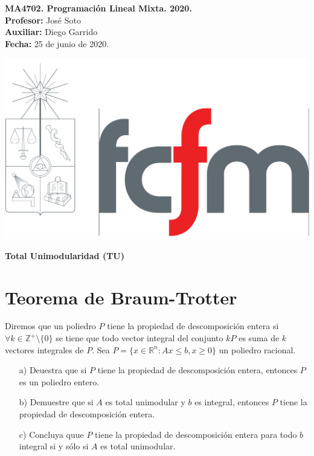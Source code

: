\documentclass[10pt]{article}
\theoremstyle{plain}
\theoremstyle{definition}
\newcommand{\sca}{Diego Garrido}
\newcommand{\fecha}{25 de junio  de 2020}
\begin{document}
\vspace*{-1.2 cm}
\begin{minipage}{0.6\textwidth}
\begin{flushleft}
\hspace*{-0.5cm}\textbf{MA4702. Programación Lineal Mixta. 2020.}\\
\hspace*{-0.5cm}\textbf{Profesor:} José Soto\\
\hspace*{-0.5cm}\textbf{Auxiliar:} \sca\\
\hspace*{-0.5cm}\textbf{Fecha:} \fecha.
\end{flushleft}
\end{minipage}
\begin{minipage}{0.36\textwidth}
\begin{flushright}
\includegraphics[scale=0.15]{fcfm}
\end{flushright}
\end{minipage}
\bigskip

\begin{center}
\LARGE\textbf{Total Unimodularidad (TU)}
\end{center}


\section{Teorema de Braum-Trotter}

Diremos que un poliedro $P$ tiene la propiedad de descomposición entera si $\forall k \in \mathbb{Z}^{+}\setminus\{0\}$ se tiene que todo vector integral del conjunto $kP$ es suma de $k$ vectores integrales de $P$. Sea $P=\{x\in\mathbb{R}^{n}: Ax\leq b, x\geq 0\}$ un poliedro racional.
\begin{itemize}
    \item[a)] Deuestra que si $P$ tiene la propiedad de descomposición entera, entonces $P$ es un poliedro entero.
    \item[b)] Demuestre que si $A$ es total unimodular y $b$ es integral, entonces $P$ tiene la propiedad de descomposición entera.
    \item[c)] Concluya quue $P$ tiene la propiedad de descomposición entera para todo $b$ integral si y sólo si $A$ es total unimodular.
\end{itemize}
\end{document}
